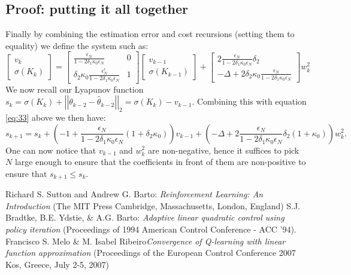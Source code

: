 \documentclass{article}[12pt]
\newcommand{\twonorm}[1]{\left|\left|#1\right|\right|_2}
\begin{document}
\subsection{Proof: putting it all together}
Finally by combining the estimation error and cost recursions (setting them to equality) we define the system such as: 
\begin{equation}\label{eq:33}
    \left[\begin{array}{c}{v_{k}} \\ {\sigma\left(K_{k}\right)}\end{array}\right]=\left[\begin{array}{cc}{\frac{\epsilon_{N}}{1-2 \delta_{1} \kappa_{0} \epsilon_{N}}} & {0} \\ {\delta_{2} \kappa_{0} \frac{\epsilon_{N}^{\epsilon}}{1-2 \delta_{1} \kappa_{0} \epsilon_{N}}} & {1}\end{array}\right]\left[\begin{array}{c}{v_{k-1}} \\ {\sigma\left(K_{k-1}\right)}\end{array}\right]+\left[\begin{array}{c}{2 \frac{\epsilon_{N}}{1-2 \delta_{1} \kappa_{0} \epsilon_{N}} \delta_{2}} \\ {-\Delta+2 \delta_{2} \kappa_{0} \frac{\epsilon_{N}}{1-2 \delta_{1} \kappa_{0} \epsilon_{N}}}\end{array}\right] w_{k}^{2}
\end{equation}
We now recall our Lyapunov function $s_k = \sigma(K_k) + \twonorm{\theta_{k-2}-\hat{\theta}_{k-2}} = \sigma(K_k)-v_{k-1}$. Combining this with equation \eqref{eq:33} above we then have:
\begin{equation}\label{eq:34}
    s_{k+1} = s_k + (-1 + \frac{\epsilon_N}{1-2\delta_1\kappa_0\epsilon_N}(1+\delta_2 \kappa_0))v_{k-1} + (-\Delta + 2\frac{\epsilon_N}{1-2\delta_1\kappa_0\epsilon_N} \delta_2(1+\kappa_0))w_k^2.
\end{equation}
One can now notice that $v_{k-1}$ and $w_k^2$ are non-negative, hence it suffices to pick $N$ large enough to ensure that the coefficients in front of them are non-positive to ensure that $s_{k+1}\leq s_k$.



\newpage
\begin{thebibliography}{unsrt}
        Richard S. Sutton and Andrew G. Barto: \emph{Reinforcement Learning: An Introduction} (The MIT Press Cambridge, Massachusetts, London, England)
        S.J. Bradtke, B.E. Ydstie, \& A.G. Barto: \emph{Adaptive linear quadratic control using policy iteration} (Proceedings of 1994 American Control Conference - ACC '94).
        Francisco S. Melo \& M. Isabel Ribeiro\emph{Convergence of Q-learning with linear function approximation} (Proceedings of the European Control Conference 2007 Kos, Greece, July 2-5, 2007)
\end{thebibliography}
\end{document}
